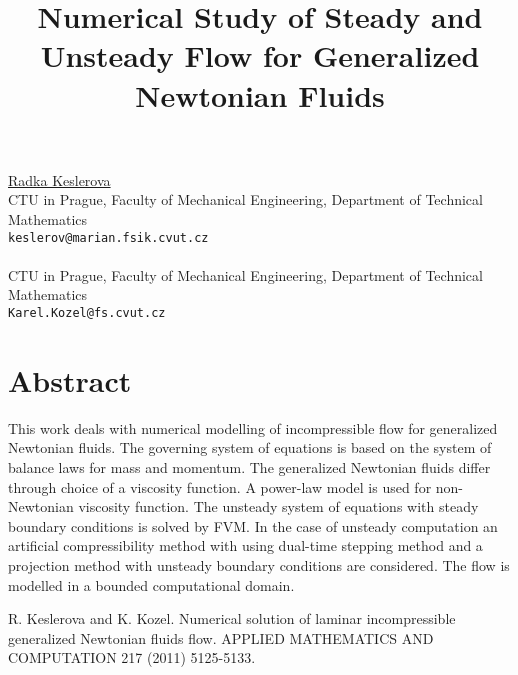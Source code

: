 \title{Numerical Study of Steady and Unsteady Flow for Generalized Newtonian Fluids}
 \author{} \institute{}
\maketitle
\begin{center}
{\large \underline{Radka Keslerova}}\\
CTU in Prague, Faculty of Mechanical Engineering, Department of Technical Mathematics\\
{\tt keslerov@marian.fsik.cvut.cz}
\\ \vspace{4mm}{\large Karel Kozel}\\
CTU in Prague, Faculty of Mechanical Engineering, Department of Technical Mathematics\\
{\tt Karel.Kozel@fs.cvut.cz}

\end{center}

\section*{Abstract}

This work deals with numerical modelling of incompressible flow for generalized Newtonian fluids. The governing system of equations is based on the system of balance laws for mass and momentum. The generalized Newtonian fluids differ through choice of a viscosity function. A power-law model is used for non-Newtonian viscosity function. The unsteady system of equations with steady boundary conditions is solved by FVM. In the case of unsteady computation an artificial compressibility method with using dual-time stepping method and a projection method with unsteady boundary conditions are considered. The flow is modelled in a bounded computational domain.


\begin{thebibliography}{10}

{\sc R. Keslerova and K. Kozel}. {Numerical solution of laminar incompressible generalized Newtonian fluids flow}. APPLIED MATHEMATICS AND COMPUTATION 217 (2011) 5125-5133.

\end{thebibliography}
